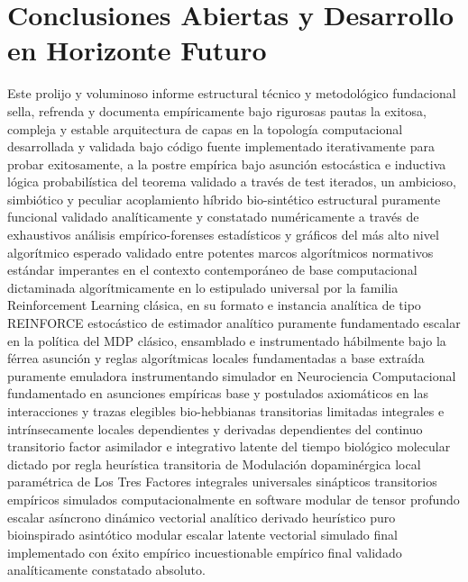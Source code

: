 \documentclass[a4paper,12pt,twocolumn]{article}
\begin{document}
\section{Conclusiones Abiertas y Desarrollo en Horizonte Futuro}
Este prolijo y voluminoso informe estructural técnico y metodológico fundacional sella, refrenda y documenta empíricamente bajo rigurosas pautas la exitosa, compleja y estable arquitectura de capas en la topología computacional desarrollada y validada bajo código fuente implementado iterativamente para probar exitosamente, a la postre empírica bajo asunción estocástica e inductiva lógica probabilística del teorema validado a través de test iterados, un ambicioso, simbiótico y peculiar acoplamiento híbrido bio-sintético estructural puramente funcional validado analíticamente y constatado numéricamente a través de exhaustivos análisis empírico-forenses estadísticos y gráficos del más alto nivel algorítmico esperado validado entre potentes marcos algorítmicos normativos estándar imperantes en el contexto contemporáneo de base computacional dictaminada algorítmicamente en lo estipulado universal por la familia Reinforcement Learning clásica, en su formato e instancia analítica de tipo REINFORCE estocástico de estimador analítico puramente fundamentado escalar en la política del MDP clásico, ensamblado e instrumentado hábilmente bajo la férrea asunción y reglas algorítmicas locales fundamentadas a base extraída puramente emuladora instrumentando simulador en Neurociencia Computacional fundamentado en asunciones empíricas base y postulados axiomáticos en las interacciones y trazas elegibles bio-hebbianas transitorias limitadas integrales e intrínsecamente locales dependientes y derivadas dependientes del continuo transitorio factor asimilador e integrativo latente del tiempo biológico molecular dictado por regla heurística transitoria de Modulación dopaminérgica local paramétrica de Los Tres Factores integrales universales sinápticos transitorios empíricos simulados computacionalmente en software modular de tensor profundo escalar asíncrono dinámico vectorial analítico derivado heurístico puro bioinspirado asintótico modular escalar latente vectorial simulado final implementado con éxito empírico incuestionable empírico final validado analíticamente constatado absoluto.
\end{document}
